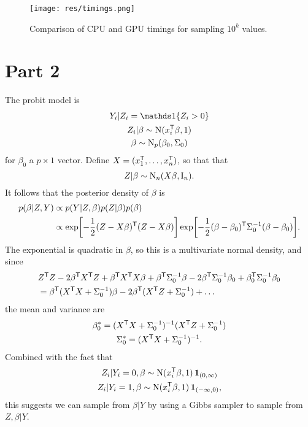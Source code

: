     \begin{figure}[p]
    \texttt{[image: res/timings.png]}
    \caption{
        Comparison of CPU and GPU timings for sampling $10^k$ values.
    }
    \label{fig:timings}
    \end{figure}

\chapter*{Part 2}
The probit model is
    \begin{gather*}
    Y_i \vert Z_i = \on{Z_i > 0}
    \\
    Z_i \vert \beta \sim \dist{N}(x_i\T\beta, 1)
    \\
    \beta \sim \dist{N}_p(\beta_0, \Sigma_0)
    \end{gather*}
for $\beta_0$ a $p \times 1$ vector.
Define $X = (x_1^\mathsf{T}, \ldots, x_n^\mathsf{T})$, so that that
    \[
    Z \vert \beta \sim \operatorname{N}_n(X\beta, \operatorname{\mathrm{I}}_n).
    \]
It follows that the posterior density of $\beta$ is
    \begin{align*}
        p(\beta \vert Z, Y)
    &\propto
        p(Y \vert Z, \beta) p(Z \vert \beta) p(\beta)
    \\ &\propto
        \exp \biggl[ -\frac{1}{2} (Z - X\beta)^\mathsf{T} (Z - X\beta) \biggr]
        \exp \biggl[ -\frac{1}{2} (\beta - \beta_0)^\mathsf{T} \Sigma_0^{-1}
        (\beta - \beta_0) \biggr].
    \end{align*}
The exponential is quadratic in $\beta$, so this is a multivariate normal
density, and since
    \begin{align*}
    &
        Z^\mathsf{T} Z - 2\beta^\mathsf{T} X^\mathsf{T} Z + \beta^\mathsf{T} X^\mathsf{T} X \beta
        + \beta^\mathsf{T} \Sigma_0^{-1} \beta - 2 \beta^\mathsf{T} \Sigma_0^{-1} \beta_0
        + \beta_0^\mathsf{T} \Sigma_0^{-1} \beta_0
    \\ &=
        \beta^\mathsf{T} (X^\mathsf{T} X + \Sigma_0^{-1}) \beta
        - 2\beta^\mathsf{T} (X^\mathsf{T} Z + \Sigma_0^{-1})
        + \ldots
    \end{align*}
the mean and variance are
    \begin{gather*}
    \beta_0^* = (X^\mathsf{T} X + \Sigma_0^{-1})^{-1} (X^\mathsf{T} Z + \Sigma_0^{-1})
    \\
    \Sigma_0^* = (X^\mathsf{T} X + \Sigma_0^{-1})^{-1}.
    \end{gather*}
Combined with the fact that
    \begin{gather*}
    Z_i \vert Y_i = 0, \beta \sim \operatorname{N}(x_i^\mathsf{T} \beta, 1) \operatorname{\mathbf{1}}_{(0, \infty)}
    \\
    Z_i \vert Y_i = 1, \beta \sim \operatorname{N}(x_i^\mathsf{T} \beta, 1) \operatorname{\mathbf{1}}_{(-\infty, 0)},
    \end{gather*}
this suggests we can sample from $\beta \vert Y$ by using a Gibbs sampler to
sample from $Z, \beta \vert Y$.

